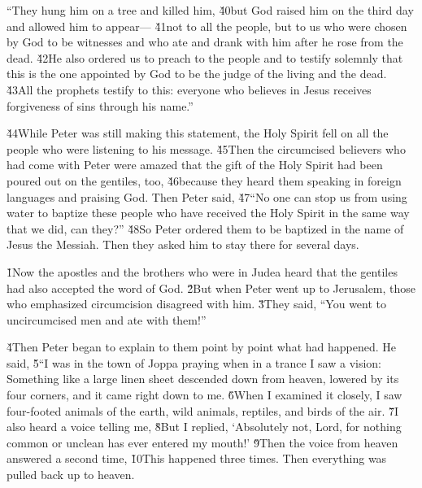 ``They hung him on a tree and killed him, \v{40}but God raised him on the third day and allowed him to appear--- \v{41}not to all the people, but to us who were chosen by God to be witnesses and who ate and drank with him after he rose from the dead. \v{42}He also ordered us to preach to the people and to testify solemnly that this is the one appointed by God to be the judge of the living and the dead. \v{43}All the prophets testify to this: everyone who believes in Jesus receives forgiveness of sins through his name.''

\v{44}While Peter was still making this statement, the Holy Spirit fell on all the people who were listening to his message. \v{45}Then the circumcised believers who had come with Peter were amazed that the gift of the Holy Spirit had been poured out on the gentiles, too, \v{46}because they heard them speaking in foreign languages and praising God. Then Peter said, \v{47}``No one can stop us from using water to baptize these people who have received the Holy Spirit in the same way that we did, can they?'' \v{48}So Peter ordered them to be baptized in the name of Jesus the Messiah. Then they asked him to stay there for several days.

\v{1}Now the apostles and the brothers who were in Judea heard that the gentiles had also accepted the word of God. \v{2}But when Peter went up to Jerusalem, those who emphasized circumcision disagreed with him. \v{3}They said, ``You went to uncircumcised men and ate with them!''

\v{4}Then Peter began to explain to them point by point what had happened. He said, \v{5}``I was in the town of Joppa praying when in a trance I saw a vision: Something like a large linen sheet descended down from heaven, lowered by its four corners, and it came right down to me. \v{6}When I examined it closely, I saw four-footed animals of the earth, wild animals, reptiles, and birds of the air. \v{7}I also heard a voice telling me,  \v{8}But I replied, `Absolutely not, Lord, for nothing common or unclean has ever entered my mouth!' \v{9}Then the voice from heaven answered a second time,  \v{10}This happened three times. Then everything was pulled back up to heaven.

